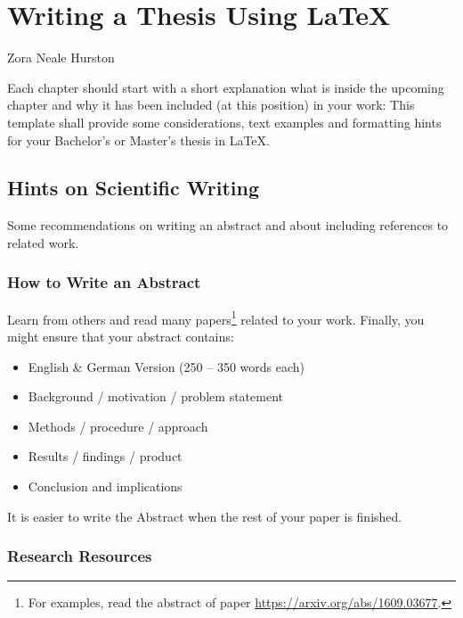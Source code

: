 \chapter{Writing a Thesis Using \LaTeX{} }
\label{chap:info_REMOVE_ME}
\chapterstart

          {Zora Neale Hurston}
          
Each chapter should start with a short explanation what is inside the upcoming chapter and why it has been included (at this position) in your work: This template shall provide some considerations, text examples and formatting hints for your Bachelor's or Master's thesis in \LaTeX{}.


\section{Hints on Scientific Writing}

Some recommendations on writing an abstract and about including references to related work. 

\subsection{How to Write an Abstract}

Learn from others and read many papers\footnote{For examples, read the abstract of paper \url{https://arxiv.org/abs/1609.03677}.} related to your work. Finally, you might ensure that your abstract contains:%
	\begin{itemize}
		\item English \& German Version (250 – 350 words each)
		\item Background / motivation / problem statement 
		\item Methods / procedure / approach
		\item Results / findings / product
		\item Conclusion and implications
	\end{itemize}

It is easier to write the Abstract when the rest of your paper is finished.

\subsection{Research Resources}


